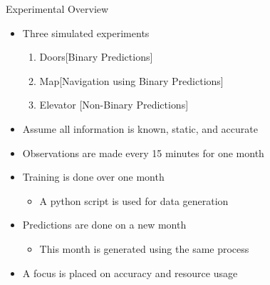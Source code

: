 \documentclass{beamer}
\begin{document}
\begin{frame}[t]{Experimental Overview}
  \begin{itemize}
    \item Three simulated experiments
    \begin{enumerate}
      \item Doors\hspace{12pt}[Binary Predictions]
      \item Map\hspace{19pt}[Navigation using Binary Predictions]
      \item Elevator [Non-Binary Predictions]
    \end{enumerate}

    \setlength\itemsep{.5em}
    \item Assume all information is known, static, and accurate
    \item Observations are made every 15 minutes for one month
    \item Training is done over one month
    \begin{itemize}
      \item A python script is used for data generation
    \end{itemize}
    \item Predictions are done on a new month
    \begin{itemize}
      \item This month is generated using the same process
    \end{itemize}
  \item A focus is placed on accuracy and resource usage
  \end{itemize}
\end{frame}
\end{document}

